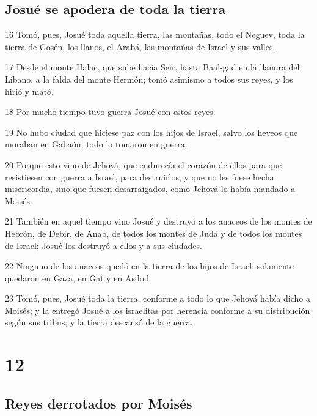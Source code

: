 \section*{Josué se apodera de toda la tierra}

\par 16 Tomó, pues, Josué toda aquella tierra, las montañas, todo el Neguev, toda la tierra de Gosén, los llanos, el Arabá, las montañas de Israel y sus valles.
\par 17 Desde el monte Halac, que sube hacia Seir, hasta Baal-gad en la llanura del Líbano, a la falda del monte Hermón; tomó asimismo a todos sus reyes, y los hirió y mató.
\par 18 Por mucho tiempo tuvo guerra Josué con estos reyes.
\par 19 No hubo ciudad que hiciese paz con los hijos de Israel, salvo los heveos que moraban en Gabaón; todo lo tomaron en guerra.
\par 20 Porque esto vino de Jehová, que endurecía el corazón de ellos para que resistiesen con guerra a Israel, para destruirlos, y que no les fuese hecha misericordia, sino que fuesen desarraigados, como Jehová lo había mandado a Moisés. 
\par 21 También en aquel tiempo vino Josué y destruyó a los anaceos de los montes de Hebrón, de Debir, de Anab, de todos los montes de Judá y de todos los montes de Israel; Josué los destruyó a ellos y a sus ciudades.
\par 22 Ninguno de los anaceos quedó en la tierra de los hijos de Israel; solamente quedaron en Gaza, en Gat y en Asdod.
\par 23 Tomó, pues, Josué toda la tierra, conforme a todo lo que Jehová había dicho a Moisés; y la entregó Josué a los israelitas por herencia conforme a su distribución según sus tribus; y la tierra descansó de la guerra.

\chapter{12}

\section*{Reyes derrotados por Moisés}

